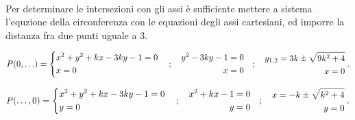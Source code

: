 \documentclass[a4paper]{article}
\begin{document}
        \paragraph{}
        Per determinare le intersezioni con gli assi è sufficiente mettere a sistema l'equzione della circonferenza con le equazioni degli assi cartesiani, ed imporre la distanza fra due punti uguale a 3.

        \[
                P(0,\ldots) = \begin{dcases}
                        x^2 + y^2 + kx -3ky - 1 = 0 \\
                        x = 0
                \end{dcases}
                \quad ; \quad
                \begin{aligned}
                        y^2 -3ky - 1 = 0 \\
                        x = 0
                \end{aligned}
                \quad ; \quad
                \begin{aligned}
                        y_{1,2} = 3k \pm \sqrt{9k^2 + 4} \\
                        x = 0
                \end{aligned}\;.
        \]

        \[
                P(\ldots,0) = \begin{dcases}
                        x^2 + y^2 + kx -3ky - 1 = 0 \\
                        y = 0
                \end{dcases}
                \quad ; \quad
                \begin{aligned}
                        x^2 + kx - 1 = 0 \\
                        y = 0
                \end{aligned}
                \quad ; \quad
                \begin{aligned}
                        x = -k \pm \sqrt{k^2 + 4} \\
                        y = 0
                \end{aligned}\;.
        \]
\end{document}
